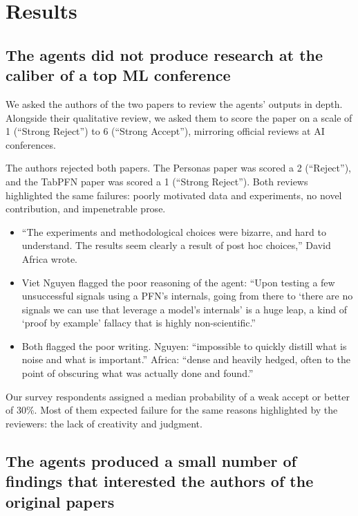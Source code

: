 \clearpage
\section{Results}
\label{sec:results}

\subsection{The agents did not produce research at the caliber of a top ML
conference}

We asked the authors of the two papers to review the agents' outputs in depth.
Alongside their qualitative review, we asked them to score the paper on a scale
of 1 (``Strong Reject'') to 6 (``Strong Accept''), mirroring official reviews
at AI conferences.

The authors rejected both papers. The Personas paper was scored a 2
(``Reject''), and the TabPFN paper was scored a 1 (``Strong Reject''). Both
reviews highlighted the same failures: poorly motivated data and experiments,
no novel contribution, and impenetrable prose.

\begin{itemize}[leftmargin=*,itemsep=3pt]
  \item ``The experiments and methodological choices were bizarre, and hard
  to understand. The results seem clearly a result of post hoc choices,''
  David Africa wrote.
  \item Viet Nguyen flagged the poor reasoning of the agent: ``Upon testing a
  few unsuccessful signals using a PFN's internals, going from there to
  `there are no signals we can use that leverage a model's internals' is a huge
  leap, a kind of `proof by example' fallacy that is highly non-scientific.''
  \item Both flagged the poor writing. Nguyen: ``impossible to quickly distill
  what is noise and what is important.'' Africa: ``dense and heavily hedged,
  often to the point of obscuring what was actually done and found.''
\end{itemize}

Our survey respondents assigned a median probability of a weak accept or better of
30\%. Most of them expected failure for the same reasons highlighted by the
reviewers: the lack of creativity and judgment.

\subsection{The agents produced a small number of findings that interested the
authors of the original papers}

